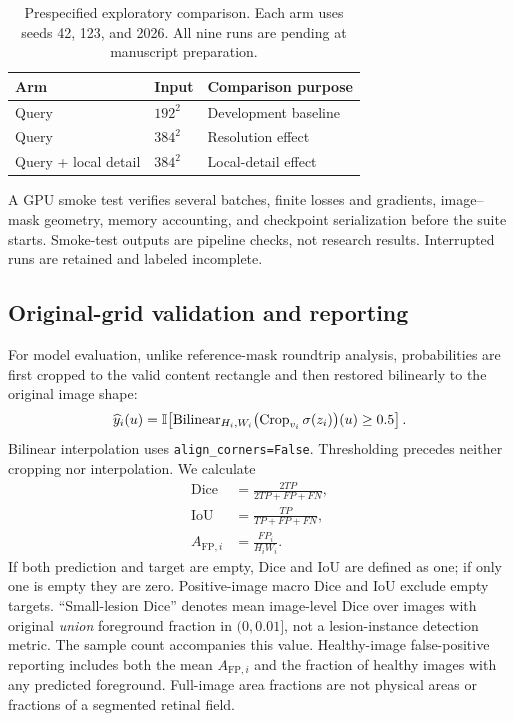 \begin{table}[t]
\centering
\caption{Prespecified exploratory comparison. Each arm uses seeds 42, 123, and 2026. All nine runs are pending at manuscript preparation.}
\begin{tabular}{lll}
\toprule Arm & Input & Comparison purpose\\\midrule
Query & $192^2$ & Development baseline\\
Query & $384^2$ & Resolution effect\\
Query + local detail & $384^2$ & Local-detail effect\\\bottomrule
\end{tabular}
\end{table}
A GPU smoke test verifies several batches, finite losses and gradients, image--mask geometry, memory accounting, and checkpoint serialization before the suite starts. Smoke-test outputs are pipeline checks, not research results. Interrupted runs are retained and labeled incomplete.

\subsection{Original-grid validation and reporting}
For model evaluation, unlike reference-mask roundtrip analysis, probabilities are first cropped to the valid content rectangle and then restored bilinearly to the original image shape:
\begin{equation}
 \widehat y_i(u)=\mathbb{I}\!\left[
 \operatorname{Bilinear}_{H_i,W_i}\bigl(\operatorname{Crop}_{v_i}\sigma(z_i)\bigr)(u)\geq0.5\right].
\end{equation}
Bilinear interpolation uses \texttt{align\_corners=False}. Thresholding precedes neither cropping nor interpolation. We calculate
\begin{align}
 \operatorname{Dice}&=\frac{2TP}{2TP+FP+FN},\\
 \operatorname{IoU}&=\frac{TP}{TP+FP+FN},\\
 A_{\mathrm{FP},i}&=\frac{FP_i}{H_iW_i}.
\end{align}
If both prediction and target are empty, Dice and IoU are defined as one; if only one is empty they are zero. Positive-image macro Dice and IoU exclude empty targets. ``Small-lesion Dice'' denotes mean image-level Dice over images with original \emph{union} foreground fraction in $(0,0.01]$, not a lesion-instance detection metric. The sample count accompanies this value. Healthy-image false-positive reporting includes both the mean $A_{\mathrm{FP},i}$ and the fraction of healthy images with any predicted foreground. Full-image area fractions are not physical areas or fractions of a segmented retinal field.

